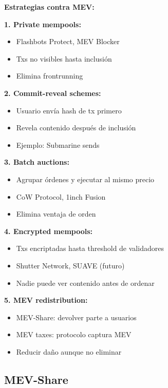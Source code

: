 \documentclass[11pt,a4paper,twoside,openright]{book}
\theoremstyle{definition}
\theoremstyle{plain}
\theoremstyle{remark}
\begin{document}
\begin{keyidea}
\textbf{Estrategias contra MEV:}

\textbf{1. Private mempools:}
\begin{itemize}
    \item Flashbots Protect, MEV Blocker
    \item Txs no visibles hasta inclusión
    \item Elimina frontrunning
\end{itemize}

\textbf{2. Commit-reveal schemes:}
\begin{itemize}
    \item Usuario envía hash de tx primero
    \item Revela contenido después de inclusión
    \item Ejemplo: Submarine sends
\end{itemize}

\textbf{3. Batch auctions:}
\begin{itemize}
    \item Agrupar órdenes y ejecutar al mismo precio
    \item CoW Protocol, 1inch Fusion
    \item Elimina ventaja de orden
\end{itemize}

\textbf{4. Encrypted mempools:}
\begin{itemize}
    \item Txs encriptadas hasta threshold de validadores
    \item Shutter Network, SUAVE (futuro)
    \item Nadie puede ver contenido antes de ordenar
\end{itemize}

\textbf{5. MEV redistribution:}
\begin{itemize}
    \item MEV-Share: devolver parte a usuarios
    \item MEV taxes: protocolo captura MEV
    \item Reducir daño aunque no eliminar
\end{itemize}
\end{keyidea}

\subsection{MEV-Share}
\end{document}

